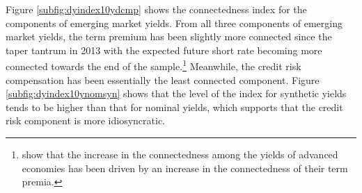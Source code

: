 \begin{appendices}

Figure \ref{subfig:dyindex10ydcmp} shows the connectedness index for the components of emerging market yields. %
From all three components of emerging market yields, the term premium has been slightly more connected since the taper tantrum in 2013 with the expected future short rate becoming more connected towards the end of the sample.\footnote{ \cite{ACDM:2019} show that the increase in the connectedness among the yields of advanced economies has been driven by an increase in the connectedness of their term premia.} 
Meanwhile, the credit risk compensation has been essentially the least connected component.
Figure \ref{subfig:dyindex10ynomsyn} shows that the level of the index for synthetic yields tends to be higher than that for nominal yields, which supports that the credit risk component is %
more idiosyncratic. %


\end{appendices}
